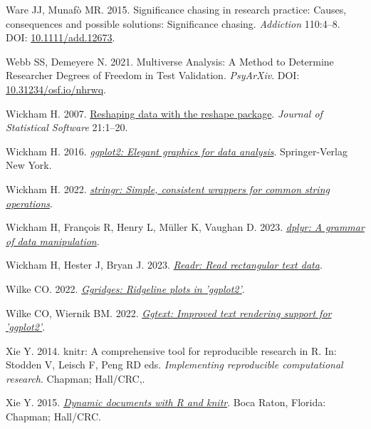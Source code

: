 \documentclass[10pt,a4paper]{article}
\newlength{\cslhangindent}
\newlength{\cslentryspacingunit} %
\newenvironment{CSLReferences}[2] %
 {%
  \setlength{\parindent}{0pt}
  \ifodd #1
  \let\oldpar\par
  \def\par{\hangindent=\cslhangindent\oldpar}
  \fi
  \setlength{\parskip}{#2\cslentryspacingunit}
 }%
 {}
\begin{document}
\begin{CSLReferences}{1}{0}
Ware JJ, Munafò MR. 2015. Significance chasing in research practice: Causes, consequences and possible solutions: {Significance} chasing. \emph{Addiction} 110:4--8. DOI: \href{https://doi.org/10.1111/add.12673}{10.1111/add.12673}.

Webb SS, Demeyere N. 2021. Multiverse {Analysis}: {A} {Method} to {Determine} {Researcher} {Degrees} of {Freedom} in {Test} {Validation}. \emph{PsyArXiv}. DOI: \href{https://doi.org/10.31234/osf.io/nhrwq}{10.31234/osf.io/nhrwq}.

Wickham H. 2007. \href{http://www.jstatsoft.org/v21/i12/}{Reshaping data with the {reshape} package}. \emph{Journal of Statistical Software} 21:1--20.

Wickham H. 2016. \emph{\href{https://ggplot2.tidyverse.org}{ggplot2: Elegant graphics for data analysis}}. Springer-Verlag New York.

Wickham H. 2022. \emph{\href{https://CRAN.R-project.org/package=stringr}{{stringr}: Simple, consistent wrappers for common string operations}}.

Wickham H, François R, Henry L, Müller K, Vaughan D. 2023. \emph{\href{https://CRAN.R-project.org/package=dplyr}{{dplyr}: A grammar of data manipulation}}.

Wickham H, Hester J, Bryan J. 2023. \emph{\href{https://CRAN.R-project.org/package=readr}{Readr: Read rectangular text data}}.

Wilke CO. 2022. \emph{\href{https://CRAN.R-project.org/package=ggridges}{Ggridges: Ridgeline plots in 'ggplot2'}}.

Wilke CO, Wiernik BM. 2022. \emph{\href{https://CRAN.R-project.org/package=ggtext}{Ggtext: Improved text rendering support for 'ggplot2'}}.

Xie Y. 2014. {knitr}: A comprehensive tool for reproducible research in {R}. In: Stodden V, Leisch F, Peng RD eds. \emph{Implementing reproducible computational research}. Chapman; Hall/CRC,.

Xie Y. 2015. \emph{\href{https://yihui.org/knitr/}{Dynamic documents with {R} and knitr}}. Boca Raton, Florida: Chapman; Hall/CRC.


\end{CSLReferences}
\end{document}
